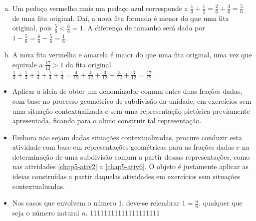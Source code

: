 \begin{multicols}{2}
\begin{solucao}{}{}
\begin{enumerate}[a)]
   \item Um pedaço vermelho mais um pedaço azul corresponde a $\frac{1}{3} + \frac{1}{2} = \frac{2}{6}+ \frac{3}{6} = \frac{5}{6}$ de uma fita original. Daí, a nova fita formada é menor do que uma fita original, pois $\frac{5}{6}<\frac{6}{6}=1$. A diferença de tamanho será dada por $1- \frac{5}{6} = \frac{6}{6} - \frac{5}{6} = \frac{1}{6}$.
   \item A nova fita vermelha e amarela é maior do que uma fita original, uma vez que equivale a $\frac{17}{12}>1$ da fita original.
$\frac{1}{3}+\frac{1}{3}+\frac{1}{4}+\frac{1}{4}+\frac{1}{4} = \frac{4}{12}+\frac{4}{12}+\frac{3}{12}+\frac{3}{12}+\frac{3}{12} = \frac{17}{12}$.
  \end{enumerate}
\end{solucao}

\begin{objetivos}[label=chap5-ativ7]{}{}


  \begin{itemize} %
    \item       Aplicar a ideia de obter um denominador comum entre duas frações dadas, com base no processo geométrico de subdivisão da unidade, em exercícios sem uma situação contextualizada e sem uma representação pictórica  previamente apresentada, ficando para o aluno construir tal representação.
 \end{itemize} %
\end{objetivos}

\begin{orientacoes}{}{}

  \begin{itemize} %
    \item       Embora não sejam dadas situações contextualizadas, procure conduzir esta atividade com base em representações geométricas para as frações dadas e na determinação de uma subdivisão comum a partir dessas representações, como nas atividades \ref{chap5-ativ2} a \ref{chap5-ativ6}. O objeto é justamente aplicar as ideias construídas a partir daquelas atividades em exercícios sem situações contextualizadas.
    \item  Nos casos que envolvem o número 1, deve-se relembrar   $1 = \frac{n}{n}$, qualquer que seja o número natural $n$.
11111111111111111111  \end{itemize} %
\end{orientacoes}



\end{multicols}
